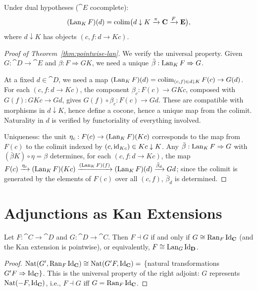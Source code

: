 \begin{theorem}
\label{thm:pointwise-lan}
Under dual hypotheses ($\cat{E}$ cocomplete):
\[
  (\operatorname{Lan}_K F)(d) = \operatorname{colim}\bigl(d \downarrow K \xrightarrow{\pi} \mathbf{C} \xrightarrow{F} \mathbf{E}\bigr),
\]
where $d \downarrow K$ has objects $(c, f: d \to Kc)$.
\end{theorem}

\begin{proof}[Proof of Theorem~\ref{thm:pointwise-lan}]
We verify the universal property. Given $G: \cat{D} \to \cat{E}$ and $\beta: F \Rightarrow GK$, we need a unique $\bar\beta: \operatorname{Lan}_K F \Rightarrow G$.

At a fixed $d \in \cat{D}$, we need a map $(\operatorname{Lan}_K F)(d) = \operatorname{colim}_{(c,f) \in d\downarrow K} F(c) \to G(d)$. For each $(c, f: d \to Kc)$, the component $\beta_c: F(c) \to GKc$, composed with $G(f): GKc \to Gd$, gives $G(f) \circ \beta_c: F(c) \to Gd$. These are compatible with morphisms in $d \downarrow K$, hence define a cocone, hence a unique map from the colimit. Naturality in $d$ is verified by functoriality of everything involved.

Uniqueness: the unit $\eta_c: F(c) \to (\operatorname{Lan}_K F)(Kc)$ corresponds to the map from $F(c)$ to the colimit indexed by $(c, \mathrm{id}_{Kc}) \in Kc \downarrow K$. Any $\bar\beta: \operatorname{Lan}_K F \Rightarrow G$ with $(\bar\beta K) \circ \eta = \beta$ determines, for each $(c, f: d \to Kc)$, the map $F(c) \xrightarrow{\eta_c} (\operatorname{Lan}_K F)(Kc) \xrightarrow{(\operatorname{Lan}_K F)(f)} (\operatorname{Lan}_K F)(d) \xrightarrow{\bar\beta_d} Gd$; since the colimit is generated by the elements of $F(c)$ over all $(c,f)$, $\bar\beta_d$ is determined.
\end{proof}

\section{Adjunctions as Kan Extensions}

\begin{theorem}
\label{thm:adj-as-kan}
Let $F: \cat{C} \to \cat{D}$ and $G: \cat{D} \to \cat{C}$. Then $F \dashv G$ if and only if $G \cong \operatorname{Ran}_F \mathrm{Id}_{\mathbf{C}}$ (and the Kan extension is pointwise), or equivalently, $F \cong \operatorname{Lan}_G \mathrm{Id}_{\mathbf{D}}$.
\end{theorem}

\begin{proof}
$\operatorname{Nat}(G', \operatorname{Ran}_F \mathrm{Id}_{\mathbf{C}}) \cong \operatorname{Nat}(G'F, \mathrm{Id}_{\mathbf{C}}) = $ \{natural transformations $G'F \Rightarrow \mathrm{Id}_{\mathbf{C}}\}$. This is the universal property of the right adjoint: $G$ represents $\operatorname{Nat}(-F, \mathrm{Id}_{\mathbf{C}})$, i.e., $F \dashv G$ iff $G = \operatorname{Ran}_F \mathrm{Id}_{\mathbf{C}}$.
\end{proof}

